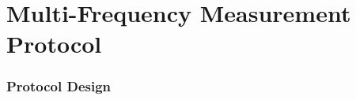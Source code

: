 \documentclass[11pt]{article}
\theoremstyle{definition}
\theoremstyle{remark}
\begin{document}
\part{Multi-Frequency Measurement Protocol}
\label{part:protocol}


\section{Protocol Design}
\label{sec:protocol-design}
\end{document}
